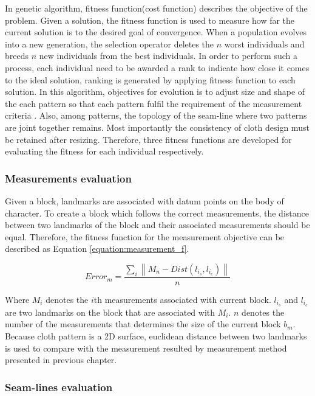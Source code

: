 In genetic algorithm, fitness function(cost function) describes the objective of the problem.  Given a solution, the fitness function is used to measure how far the current solution is to the desired goal of convergence. When a population evolves into a new generation, the selection operator deletes the $n$ worst individuals and breeds $n$ new individuals from the best individuals. In order to perform such a process, each individual need to be awarded a rank to indicate how close it comes to the ideal solution, ranking is generated by applying fitness function to each solution. In this algorithm, objectives for evolution is to adjust size and shape of the each pattern so that each pattern fulfil the requirement of the measurement criteria . Also, among patterns, the topology of the seam-line where two patterns are joint together remains. Most importantly the consistency of cloth design must be retained after resizing. Therefore, three fitness functions are developed for evaluating the fitness for each individual respectively.

\subsubsection{Measurements evaluation}
Given a block, landmarks are associated with datum points on the body of character. To create a block which follows the correct measurements, the distance between two landmarks of the block and their associated measurements should be equal. Therefore, the fitness function for the measurement objective can be described as Equation \ref{equation:measurement_f}.

\begin{equation}
Error_{m} = \frac{\sum_{i} \left \| M_{n} - Dist(l_{i_{s}}, l_{i_{e}}) \right \|}{n}
\label{equation:measurement_f}
\end{equation}

Where $M_{i}$ denotes the $i$th measurements associated with current block.  $l_{i_{s}}$ and $l_{i_{e}}$ are two landmarks on the block that are associated with $M_{i}$. $n$ denotes the number of the measurements that determines the size of the current block $b_{m}$. Because cloth pattern is a 2D surface, euclidean distance between two landmarks is used to compare with the measurement resulted by measurement method presented in previous chapter.

\subsubsection{Seam-lines evaluation}

